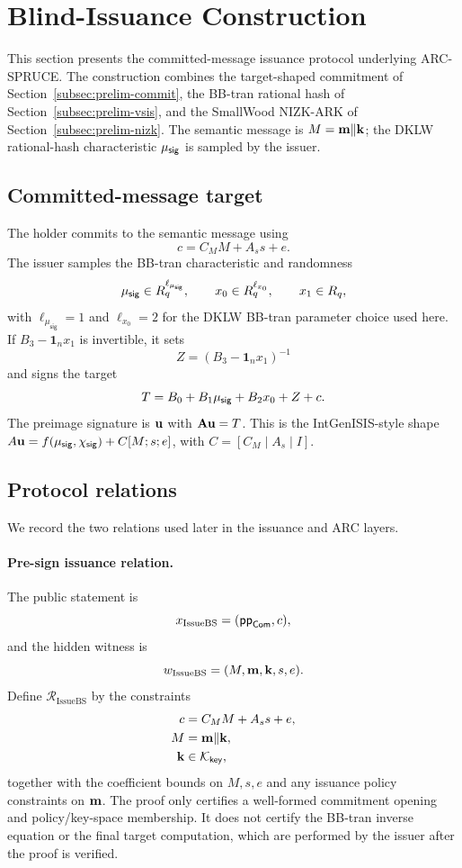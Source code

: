 \section{Blind-Issuance Construction}
\label{sec:blind-signature}

This section presents the committed-message issuance protocol underlying ARC-SPRUCE.  The construction combines
the target-shaped commitment of Section~\ref{subsec:prelim-commit}, the BB-tran rational hash of
Section~\ref{subsec:prelim-vsis}, and the SmallWood NIZK-ARK of Section~\ref{subsec:prelim-nizk}.  The semantic
message is \(M=\mathbf{m}\Vert\mathbf{k}\); the DKLW rational-hash characteristic \(\mu_{\mathsf{sig}}\) is sampled by the issuer.

\subsection{Committed-message target}
The holder commits to the semantic message using
\[
  c=C_MM+A_s s+e.
\]
The issuer samples the BB-tran characteristic and randomness
\[
  \mu_{\mathsf{sig}}\in R_q^{\ell_{\mu_{\mathsf{sig}}}},
  \qquad
  x_0\in R_q^{\ell_{x_0}},
  \qquad
  x_1\in R_q,
\]
with \(\ell_{\mu_{\mathsf{sig}}}=1\) and \(\ell_{x_0}=2\) for the DKLW BB-tran parameter choice used here.  If
\(B_3-\mathbf 1_nx_1\) is invertible, it sets
\[
  Z=(B_3-\mathbf 1_nx_1)^{-1}
\]
and signs the target
\begin{equation}
  T=B_0+B_1\mu_{\mathsf{sig}}+B_2x_0+Z+c.
  \label{eq:bs-committed-target}
\end{equation}
The preimage signature is \(\mathbf{u}\) with \(\mathbf{A}\mathbf{u}=T\).  This is the IntGenISIS-style shape
\(A\mathbf{u}=f(\mu_{\mathsf{sig}},\chi_{\mathsf{sig}})+C[M;s;e]\), with \(C=[C_M\mid A_s\mid I]\).

\subsection{Protocol relations}
We record the two relations used later in the issuance and ARC layers.

\paragraph{Pre-sign issuance relation.}
The public statement is
\[
  x_{\mathrm{IssueBS}}=(\mathsf{pp}_{\mathsf{Com}},c),
\]
and the hidden witness is
\[
  w_{\mathrm{IssueBS}}=(M,\mathbf{m},\mathbf{k},s,e).
\]
Define \(\mathcal R_{\mathrm{IssueBS}}\) by the constraints
\begin{align}
  c&=C_MM+A_s s+e, \label{eq:issuebs-rel-commit}\\
  M&=\mathbf{m}\Vert\mathbf{k}, \label{eq:issuebs-rel-encode}\\
  \mathbf{k}&\in\mathcal K_{\mathsf{key}}, \label{eq:issuebs-rel-key}
\end{align}
together with the coefficient bounds on \(M,s,e\) and any issuance policy constraints on \(\mathbf{m}\).  The proof only
certifies a well-formed commitment opening and policy/key-space membership.  It does not certify the BB-tran
inverse equation or the final target computation, which are performed by the issuer after the proof is verified.

